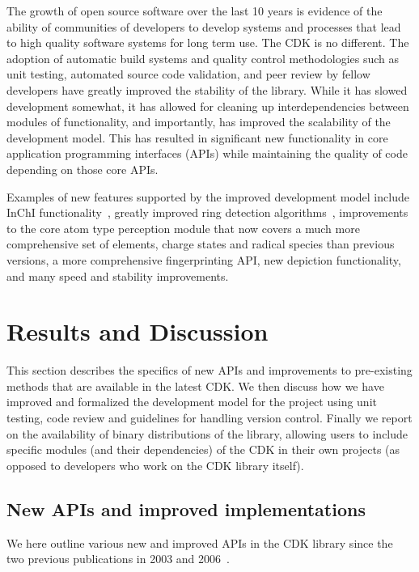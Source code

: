 \documentclass[doublespacing]{bmcart}
\begin{document}
The growth of open source software over the last 10 years is evidence           %
of the ability of communities of developers to develop systems and
processes that lead to high quality software systems for long term
use. The CDK is no different. The adoption of automatic build systems
and quality control methodologies such as unit testing, automated
source code validation, and peer review by fellow developers have
greatly improved the stability of the library. While it has slowed
development somewhat, it has allowed for cleaning up interdependencies
between modules of functionality, and importantly, has improved the scalability
of the development model.  This has resulted in significant new
functionality in core application programming interfaces (APIs)
while maintaining the quality of code depending on those core APIs.

Examples of new features supported by the improved development model
include InChI functionality~\cite{Spjuth2013}, greatly improved ring
detection algorithms~\cite{May2014}, improvements to the core atom
type perception module that now covers a much more comprehensive set
of elements, charge states and radical species than previous versions,
a more comprehensive fingerprinting API, new depiction functionality,
and many speed and stability improvements.

\section*{Results and Discussion}

This section describes the specifics of new APIs and
improvements to pre-existing methods that are available in the latest
CDK.  We then discuss how we have improved and formalized the
development model for the project using unit testing, code review and
guidelines for handling version control. Finally we report on the
availability of binary distributions of the library, allowing users to
include specific modules (and their dependencies) of the CDK in their
own projects (as opposed to developers who work on the CDK library
itself).

\subsection*{New APIs and improved implementations}

We here outline various new and improved APIs in the CDK library since the
two previous publications in 2003 and 2006~\cite{Steinbeck2003,Steinbeck2006}.
\end{document}

